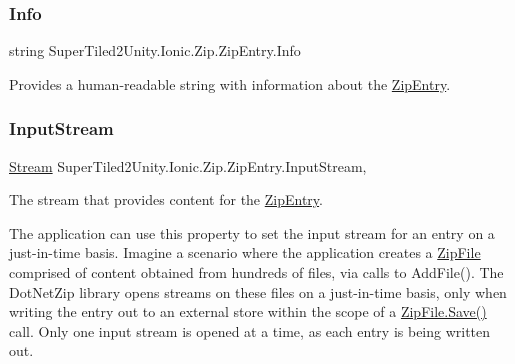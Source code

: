 \subsubsection{\texorpdfstring{Info}{Info}}
{\footnotesize\ttfamily string Super\+Tiled2\+Unity.\+Ionic.\+Zip.\+Zip\+Entry.\+Info\hspace{0.3cm}{\ttfamily [get]}}



Provides a human-\/readable string with information about the \mbox{\hyperlink{class_super_tiled2_unity_1_1_ionic_1_1_zip_1_1_zip_entry}{Zip\+Entry}}. 

\mbox{\label{class_super_tiled2_unity_1_1_ionic_1_1_zip_1_1_zip_entry_a9c5db72a0ee3dad46be934c75ffcfe91}} 
\subsubsection{\texorpdfstring{Input\+Stream}{InputStream}}
{\footnotesize\ttfamily \mbox{\hyperlink{namespace_super_tiled2_unity_1_1_ionic_1_1_zip_a9ced5352c56e7e0fceff15b534073c83aeae835e83c0494a376229f254f7d3392}{Stream}} Super\+Tiled2\+Unity.\+Ionic.\+Zip.\+Zip\+Entry.\+Input\+Stream\hspace{0.3cm}{\ttfamily [get]}, {\ttfamily [set]}}



The stream that provides content for the \mbox{\hyperlink{class_super_tiled2_unity_1_1_ionic_1_1_zip_1_1_zip_entry}{Zip\+Entry}}. 

The application can use this property to set the input stream for an entry on a just-\/in-\/time basis. Imagine a scenario where the application creates a {\ttfamily \mbox{\hyperlink{class_super_tiled2_unity_1_1_ionic_1_1_zip_1_1_zip_file}{Zip\+File}}} comprised of content obtained from hundreds of files, via calls to {\ttfamily Add\+File()}. The Dot\+Net\+Zip library opens streams on these files on a just-\/in-\/time basis, only when writing the entry out to an external store within the scope of a {\ttfamily \mbox{\hyperlink{class_super_tiled2_unity_1_1_ionic_1_1_zip_1_1_zip_file_aff8f1b3d07b66481e2629b04017a056f}{Zip\+File.\+Save()}}} call. Only one input stream is opened at a time, as each entry is being written out. 

